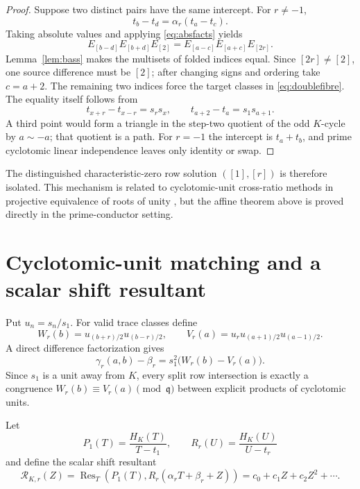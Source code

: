 \documentclass[11pt]{article}
\newcommand{\Res}{\operatorname{Res}}
\begin{document}
\begin{proof}
Suppose two distinct pairs have the same intercept.  For $r\ne-1$,
\[
t_b-t_d=\alpha_r(t_a-t_c).
\]
Taking absolute values and applying \eqref{eq:absfacts} yields
\[
E_{[b-d]}E_{[b+d]}E_{[2]}
 =E_{[a-c]}E_{[a+c]}E_{[2r]}.
\]
Lemma~\ref{lem:bass} makes the multisets of folded indices equal.  Since
$[2r]\ne[2]$, one source difference must be $[2]$; after changing signs and
ordering take $c=a+2$.  The remaining two indices force the target classes in
\eqref{eq:doublefibre}.  The equality itself follows from
\[
t_{x+r}-t_{x-r}=s_rs_x,
\qquad
t_{a+2}-t_a=s_1s_{a+1}.
\]
A third point would form a triangle in the step-two quotient of the odd
$K$-cycle by $a\sim-a$; that quotient is a path.  For $r=-1$ the intercept is
$t_a+t_b$, and prime cyclotomic linear independence leaves only identity or
swap.
\end{proof}

The distinguished characteristic-zero row solution $([1],[r])$ is therefore
isolated.  This mechanism is related to cyclotomic-unit cross-ratio methods in
projective equivalence of roots of unity \cite{Fu2022}, but the affine theorem
above is proved directly in the prime-conductor setting.

\section{Cyclotomic-unit matching and a scalar shift resultant}

Put $u_n=s_n/s_1$.  For valid trace classes define
\begin{equation}\label{eq:WV}
W_r(b)=u_{(b+r)/2}u_{(b-r)/2},\qquad
V_r(a)=u_ru_{(a+1)/2}u_{(a-1)/2}.
\end{equation}
A direct difference factorization gives
\begin{equation}\label{eq:unitmatch}
\gamma_r(a,b)-\beta_r=s_1^2\bigl(W_r(b)-V_r(a)\bigr).
\end{equation}
Since $s_1$ is a unit away from $K$, every split row intersection is exactly a
congruence $W_r(b)\equiv V_r(a)\pmod{\mathfrak q}$ between explicit products
of cyclotomic units.

Let
\[
P_1(T)=\frac{H_K(T)}{T-t_1},\qquad
R_r(U)=\frac{H_K(U)}{U-t_r}
\]
and define the scalar shift resultant
\begin{equation}\label{eq:shiftres}
\mathcal R_{K,r}(Z)
 =\Res_T\!\left(P_1(T),R_r(\alpha_rT+\beta_r+Z)\right)
 =c_0+c_1Z+c_2Z^2+\cdots.
\end{equation}
\end{document}
